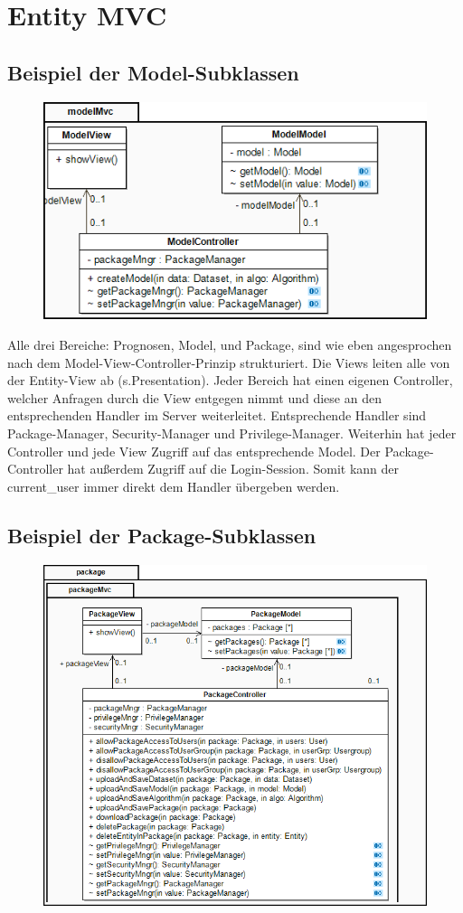 \section{Entity MVC}

\subsection{Beispiel der Model-Subklassen}

\begin{figure}[h]
\centering
\includegraphics[width=0.6\linewidth]{Grafik/Klassendiagramme/Entity_mvc_sub.png}
\end{figure}

Alle drei Bereiche: Prognosen, Model, und Package, sind wie eben angesprochen nach dem Model-View-Controller-Prinzip strukturiert. Die Views leiten alle von der Entity-View ab (s.Presentation).
Jeder Bereich hat einen eigenen Controller, welcher Anfragen durch die View entgegen nimmt und diese an den entsprechenden Handler im Server weiterleitet.
Entsprechende Handler sind Package-Manager, Security-Manager und Privilege-Manager. Weiterhin hat jeder Controller und jede View Zugriff auf das entsprechende 
Model. Der Package-Controller hat außerdem Zugriff auf die Login-Session. Somit kann der current\_user immer direkt dem Handler übergeben werden.

\subsection{Beispiel der Package-Subklassen}

\begin{figure}[h]
\centering
\includegraphics[width=0.6\linewidth]{Grafik/Klassendiagramme/Entity_mvc_sub2.png}
\end{figure}